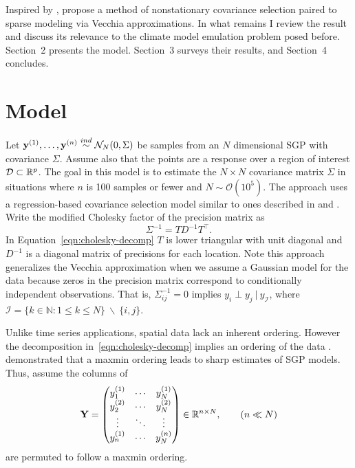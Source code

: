 \documentclass[letterpaper]{article}
\begin{document}
  Inspired by \citet{Huang2006}, \citet{Kidd2021} propose a method of nonstationary
  covariance selection paired to sparse modeling via Vecchia approximations. In
  what remains I review the \citet{Kidd2021} result and discuss its relevance to
  the climate model emulation problem posed before. Section~2 presents the model.
  Section~3 surveys their results, and Section~4 concludes.


\section{Model}\label{sec:model}

  Let $\mathbf{y}^{(1)}, \dots, \mathbf{y}^{(n)} \overset{ind}{\sim} \mathcal{N}_{N}(0, \Sigma)$ be
  samples from an $N$ dimensional SGP with covariance $\Sigma$. Assume also that
  the points are a response over a region of interest $\mathcal{D} \subset \mathbb{R}^{p}$.
  The goal in this model is to estimate the $N \times N$ covariance matrix $\Sigma$
  in situations where $n$ is 100 samples or fewer and $N \sim \mathcal{O}(10^{5})$.
  The approach uses a regression-based covariance selection model similar to ones
  described in \cite{Daniels2002} and \citet{Huang2006}. Write the modified Cholesky
  factor of the precision matrix as
  \begin{equation}
    \Sigma^{-1} = T D^{-1} T^{\top}.
    \label{eqn:cholesky-decomp}
  \end{equation}
  In Equation~\eqref{eqn:cholesky-decomp} $T$ is lower triangular with unit diagonal
  and $D^{-1}$ is a diagonal matrix of precisions for each location. Note this approach
  generalizes the Vecchia approximation when we assume a Gaussian model for the
  data because zeros in the precision matrix correspond to conditionally independent
  observations. That is, $\Sigma_{ij}^{-1} = 0$ implies $y_{i} \perp y_{j}\ |\ y_{\mathcal{I}}$,
  where $\mathcal{I} = \{k \in \mathbb{N}: 1 \leq k \leq N\}\ \backslash\ \{i, j\}$.

  Unlike time series applications, spatial data lack an inherent ordering. However
  the decomposition in~\eqref{eqn:cholesky-decomp} implies an ordering of the data
  \citep{Pourahmadi2011}. \citet{Guinness2018} demonstrated that a maxmin ordering
  leads to sharp estimates of SGP models. Thus, assume the columns of
  \begin{equation*}
    \mathbf{Y} = \begin{pmatrix}
      y_{1}^{(1)} & \cdots & y_{N}^{(1)} \\
      y_{2}^{(2)} & \cdots & y_{N}^{(2)} \\
        \vdots    & \ddots &  \vdots \\
      y_{n}^{(1)} & \cdots & y_{N}^{(n)} \\
    \end{pmatrix}
    \in \mathbb{R}^{n \times N},
    \qquad (n \ll N)
  \end{equation*}
  are permuted to follow a maxmin ordering.
\end{document}
